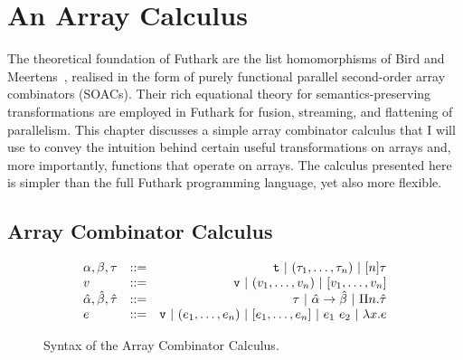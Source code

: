 \newcommand{\zip}{\mathrm{zip}}
\newcommand{\unzip}{\mathrm{unzip}}
\newcommand{\map}{\mathrm{map}}
\newcommand{\reduce}{\mathrm{reduce}}
\newcommand{\scan}{\mathrm{scan}}
\newcommand{\ascan}{\mathrm{ascan}}
\newcommand{\sscan}{\mathrm{sscan}}
\newcommand{\inj}{\mathrm{inj}}
\newcommand{\rep}{\mathrm{rep}}
\newcommand{\streamFold}{\mathrm{sFold}}
\newcommand{\fold}{\mathrm{fold}}
\newcommand{\seg}[1]{\mathbf{#1}}
\newcommand{\tto}{\,\Rightarrow\,}
\newcommand{\iso}{\,\Leftrightarrow\,}
\newcommand{\nat}{\mathbf{N}}
\newcommand{\concat}{\#}
\newcommand{\idd}{\mathrm{id}}
\newcommand{\Id}{\mathrm{id}}
\newcommand{\foldl}{\mathrm{foldl}}

\chapter{An Array Calculus}

The theoretical foundation of Futhark are the list homomorphisms of
Bird and Meertens~\cite{Bird2}, realised in the form of purely
functional parallel second-order array combinators (SOACs). Their rich
equational theory for semantics-preserving transformations are
employed in Futhark for fusion, streaming, and flattening of
parallelism.  This chapter discusses a simple array combinator
calculus that I will use to convey the intuition behind certain useful
transformations on arrays and, more importantly, functions that
operate on arrays.  The calculus presented here is simpler than the
full Futhark programming language, yet also more flexible.

\section{Array Combinator Calculus}
\label{sec:arraycombinators}

\begin{figure}
  \centering
$$
\begin{array}{lrr}
  \alpha,\beta,\tau & ::= & \mbox{\texttt{t}}\ |\ (\tau_1, \ldots, \tau_n)\ |\ [n]\tau \\

  v & ::= & \mbox{\texttt{v}}\ |\ (v_{1}, \ldots, v_{n})\ |\ [v_{1}, \ldots, v_{n}] \\

  \hat{\alpha},\hat{\beta},\hat{\tau} &::=& \tau\ |\ \hat{\alpha}\rightarrow\hat{\beta}\ |\ \Pi n.\hat{\tau} \\

  e &::=& \mbox{\texttt{v}}\ |\ (e_{1}, \ldots, e_{n})\ |\ [e_{1}, \ldots, e_{n}]\ |\ e_1~e_2\ |\ \lambda x.e
\end{array}
$$
  \caption{Syntax of the Array Combinator Calculus.}
  \label{fig:arraycalculus_syntax}
\end{figure}

